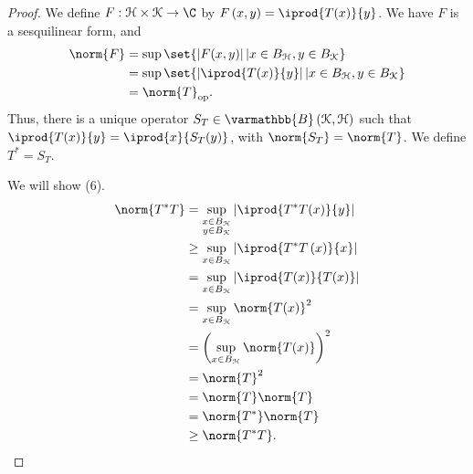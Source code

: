 \documentclass[10pt]{mypackage}
\renewcommand*{\mathbb}[1]{\varmathbb{#1}}
\newcommand{\B}{\mathbb{B}}
\begin{document}
\begin{proof}
  We define $F: \mathcal{H}\times \mathcal{K}\rightarrow \C$ by $F\left(x,y\right) = \iprod{T(x)}{y}$. We have $F$ is a sesquilinear form, and
  \begin{align*}
    \norm{F} &= \sup\set{\left\vert F(x,y) \right\vert | x\in B_{\mathcal{H}},y\in B_{\mathcal{K}}}\\
             &= \sup\set{\left\vert \iprod{T(x)}{y} \right\vert | x\in B_{\mathcal{H}},y\in B_{\mathcal{K}}}\\
             &= \norm{T}_{\text{op}}.
  \end{align*}
  Thus, there is a unique operator $S_T\in \B\left(\mathcal{K},\mathcal{H}\right)$ such that $ \iprod{T(x)}{y} = \iprod{x}{S_T(y)} $, with $\norm{S_T} = \norm{T}$. We define $T^{\ast} = S_T$.\newline

  We will show (6).
  \begin{align*}
    \norm{T^{\ast}T} &= \sup_{\substack{x\in B_{\mathcal{H}}\\y\in B_{\mathcal{K}}}} \left\vert \iprod{T^{\ast} T (x)}{y} \right\vert\\
                     &\geq \sup_{x\in B_{\mathcal{H}}} \left\vert \iprod{T^{\ast}T\left(x\right)}{x} \right\vert\\
                     &= \sup_{x\in B_{\mathcal{H}}}\left\vert \iprod{T(x)}{T(x)} \right\vert\\
                     &= \sup_{x\in B_{\mathcal{H}}} \norm{T(x)}^2\\
                     &= \left(\sup_{x\in B_{\mathcal{H}}}\norm{T(x)}\right)^2\\
                     &= \norm{T}^2\\
                     &= \norm{T}\norm{T}\\
                     &= \norm{T^{\ast}}\norm{T}\\
                     &\geq \norm{T^{\ast}T}.
  \end{align*}
\end{proof}
\end{document}
